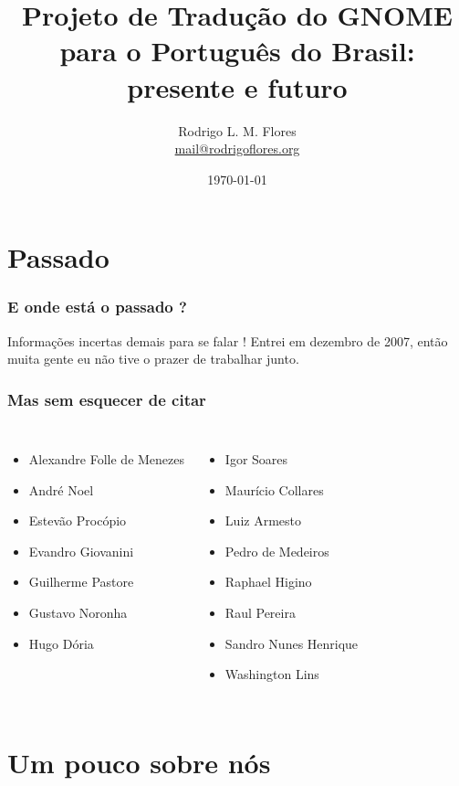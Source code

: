 \documentclass{beamer}
\title{Projeto de Tradução do GNOME para o Português do Brasil: presente e futuro}
\author{Rodrigo L. M. Flores \\ \url{mail@rodrigoflores.org}}
\institute{GNOME Brasil}
\begin{document}
\date{\today}

\frame{\titlepage}

\frame{\tableofcontents}

\section{Passado}

\begin{frame}
    \frametitle{E onde está o passado ?}
    Informações incertas demais para se falar ! Entrei em dezembro de 2007, então muita gente eu não tive
    o prazer de trabalhar junto. 
\end{frame}

\begin{frame}
    \frametitle{Mas sem esquecer de citar}
    \begin{columns}[c]
      \column{1.5in}
        \begin{itemize}
          \item Alexandre Folle de Menezes
          \item André Noel
          \item Estevão Procópio
          \item Evandro Giovanini
          \item Guilherme Pastore
          \item Gustavo Noronha
          \item Hugo Dória
       \end{itemize}
       \column{1.5in}
       \begin{itemize}
          \item Igor Soares
          \item Maurício Collares
          \item Luiz Armesto
          \item Pedro de Medeiros
          \item Raphael Higino
          \item Raul Pereira
          \item Sandro Nunes Henrique 
          \item Washington Lins
        \end{itemize}
    \end{columns}
\end{frame}

\section{Um pouco sobre nós}
\end{document}
